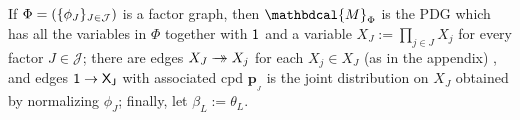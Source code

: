 \documentclass[letterpaper]{article} %
\theoremstyle{plain}
\theoremstyle{definition}
\theoremstyle{remark}
\newcommand\mat[1]{\mathbf{#1}}
\newcommand{\tto}{\rightarrow\mathrel{\mspace{-15mu}}\rightarrow}
\newcommand{\bp}[1][L]{\mat{p}_{\!_{#1}\!}}
\newcommand{\dg}[1]{\mathbdcal{#1}}
\newcommand{\PDGof}[1]{{\dg M}_{#1}}
\begin{document}
\begin{defn} \label{def:fg2PDG}
If $\Phi=(\{\phi_J\}_{J \in \cal J})$ is a factor graph, then 
$\PDGof{\Phi}$ is the PDG which has all the variables in $\Phi$
together with $\sf 1$ and a variable
$X_J := \prod_{j \in J} X_j$ for every factor $J \in \mathcal J$;
there are edges $X_J \tto X_j$ for each $X_j \in X_J$
(as in the appendix)%
, and edges $\sf 1 \to X_J$ with
associated cpd $\bp[J]$ is the joint distribution on $X_J$ obtained by
normalizing $\phi_J$; finally, let $\beta_L := \theta_L$. 
\end{defn}
\end{document}
